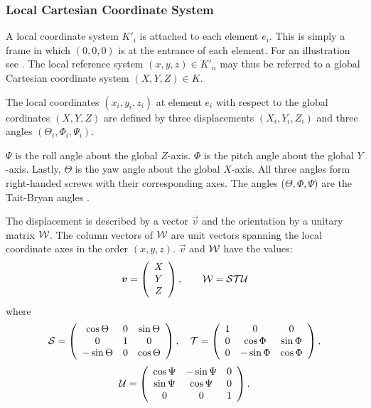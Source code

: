 \subsubsection{Local Cartesian Coordinate System}
A local coordinate system $K'_i$ is attached to each element $e_i$. This is simply a frame in which $(0,0,0)$ is at the entrance of  each element. For an illustration see . The local reference system $(x, y, z) \in K'_n$
may thus be referred to a global Cartesian coordinate system $(X, Y, Z) \in K$.

The local coordinates $(x_i, y_i, z_i)$ at element $e_i$ with respect to the global cordinates $(X, Y, Z)$ are defined by three displacements $(X_i, Y_i, Z_i)$ and three angles $(\Theta_i, \Phi_i, \Psi_i)$.

$\Psi$ is the roll angle about the global $Z$-axis. $\Phi$ is the pitch angle about the global $Y$-axis. Lastly, $\Theta$ is the yaw angle about the global $X$-axis. All three angles form right-handed screws with their corresponding axes. The angles ($\Theta,\Phi,\Psi$) are the  Tait-Bryan angles \cite{bib:tait-bryan}.

The displacement is described by a vector $\vec{v}$
and the orientation by a unitary matrix $\mathcal{W}$.
The column vectors of $\mathcal{W}$ are unit vectors spanning
the local coordinate axes in the order $(x, y, z)$.
$\vec{v}$ and $\mathcal{W}$ have the values:
\begin{equation}
\vec{v} =\left(\begin{array}{c}
    X \\
    Y \\
    Z
  \end{array}\right),
\qquad
\matr{W}=\matr{S}\matr{T}\matr{U}
\end{equation}
where
\begin{equation}
\matr{S}=\left(\begin{array}{ccc}
    \cos\Theta &  0 &  \sin\Theta \\
    0         &  1 &   0 \\
    -\sin\Theta &  0 &  \cos\Theta
  \end{array}\right),
\quad
\matr{T}=\left(\begin{array}{ccc}
    1 &  0        &  0 \\
    0 &  \cos\Phi &  \sin\Phi \\
    0 & -\sin\Phi &  \cos\Phi
  \end{array}\right),
\end{equation}
\begin{equation}
\matr{U}=\left(\begin{array}{ccc}
    \cos\Psi & -\sin\Psi &  0 \\
    \sin\Psi &  \cos\Psi &  0 \\
    0        &  0        &  1
  \end{array}\right).
\end{equation}


